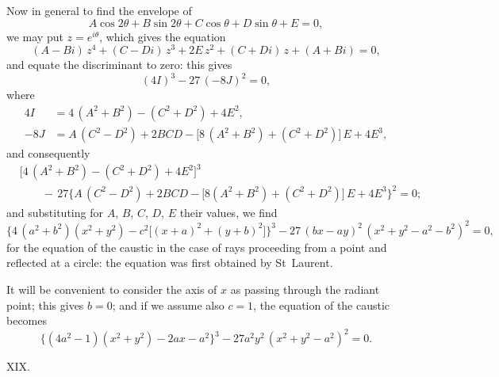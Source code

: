 \documentclass[11pt]{article}
\begin{document}
Now in general to find the envelope of
\[
A\cos 2\theta + B\sin 2\theta + C\cos\theta + D\sin\theta + E = 0,
\]
we may put $z = e^{i\theta}$, which gives the equation
\[
(A - Bi)\,z^{4} + (C - Di)\,z^{3} + 2E\,z^{2} + (C + Di)\,z + (A + Bi) = 0,
\]
and equate the discriminant to zero: this gives
\[
(4I)^{3} - 27\,(-8J)^{2} = 0,
\]
where
\begin{align*}
4I &= 4\,(A^{2} + B^{2}) - (C^{2} + D^{2}) + 4E^{2},\\
-8J &= A\,(C^{2} - D^{2}) + 2BCD - \bigl[8\,(A^{2} + B^{2}) + (C^{2} + D^{2})\bigr]\,E + 4E^{3},
\end{align*}
and consequently
\begin{align*}
&\bigl[4\,(A^{2}+B^{2}) - (C^{2}+D^{2}) + 4E^{2}\bigr]^{3}\\
&\qquad -\,27\bigl\{A\,(C^{2}-D^{2}) + 2BCD - \bigl[8(A^{2}+B^{2}) + (C^{2}+D^{2})\bigr]\,E + 4E^{3}\bigr\}^{2} = 0;
\end{align*}
and substituting for $A$, $B$, $C$, $D$, $E$ their values, we find
\[
\bigl\{4\,(a^{2}+b^{2})(x^{2}+y^{2}) - c^{2}\bigl[(x+a)^{2} + (y+b)^{2}\bigr]\bigr\}^{3} - 27\,(bx-ay)^{2}\,(x^{2}+y^{2} - a^{2} - b^{2})^{2} = 0,
\]
for the equation of the caustic in the case of rays proceeding from a point and reflected at a circle: the equation was first obtained by St~Laurent.

It will be convenient to consider the axis of $x$ as passing through the radiant point; this gives $b = 0$; and if we assume also $c = 1$, the equation of the caustic becomes
\[
\bigl\{(4a^{2}-1)(x^{2}+y^{2}) - 2ax - a^{2}\bigr\}^{3} - 27a^{2}y^{2}\,(x^{2}+y^{2} - a^{2})^{2} = 0.
\]

\medskip
\begin{center}XIX.\end{center}
\end{document}
